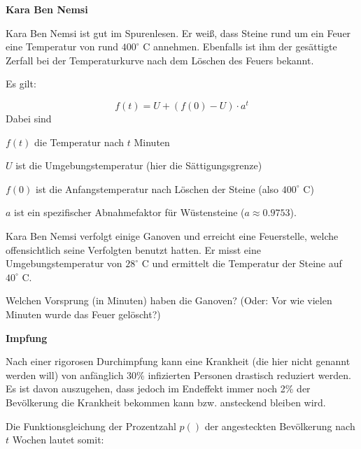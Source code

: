 \platzFuerBerechnungenBisEndeSeite{}



\bbwActAufgabenNr{} \textbf{Kara Ben Nemsi}
\nextBbwAufgabenNummer{}

Kara Ben Nemsi ist gut im Spurenlesen. Er weiß, dass Steine rund um ein Feuer eine Temperatur von rund $400^\circ$ C annehmen.
Ebenfalls ist ihm der gesättigte Zerfall bei der Temperaturkurve nach dem Löschen des Feuers bekannt.

Es gilt:

$$f(t) = U + \left(f(0) - U\right) \cdot{} a^t$$
Dabei sind

$f(t)$ die Temperatur nach $t$ Minuten

$U$ ist die Umgebungstemperatur (hier die Sättigungsgrenze)

$f(0)$ ist die Anfangstemperatur nach Löschen der Steine (also $400^\circ$ C)

$a$ ist ein spezifischer Abnahmefaktor für Wüstensteine ($a\approx 0.9753$).


Kara Ben Nemsi verfolgt einige Ganoven und erreicht eine Feuerstelle, welche offensichtlich seine Verfolgten benutzt hatten. Er misst eine Umgebungstemperatur von $28^\circ$ C und ermittelt die Temperatur der Steine auf $40^\circ$ C.

Welchen Vorsprung (in Minuten) haben die Ganoven? (Oder: Vor wie vielen Minuten wurde das Feuer gelöscht?)


\platzFuerBerechnungenBisEndeSeite{}




\bbwActAufgabenNr{} \textbf{Impfung}
\nextBbwAufgabenNummer{}

Nach einer rigorosen Durchimpfung kann eine Krankheit (die hier nicht genannt werden will) von anfänglich 30\% infizierten Personen drastisch reduziert werden. Es ist davon auszugehen, dass jedoch im Endeffekt immer noch 2\% der Bevölkerung die Krankheit bekommen kann bzw. ansteckend bleiben wird.

Die Funktionsgleichung der Prozentzahl $p()$ der angesteckten Bevölkerung nach $t$ Wochen lautet somit:


